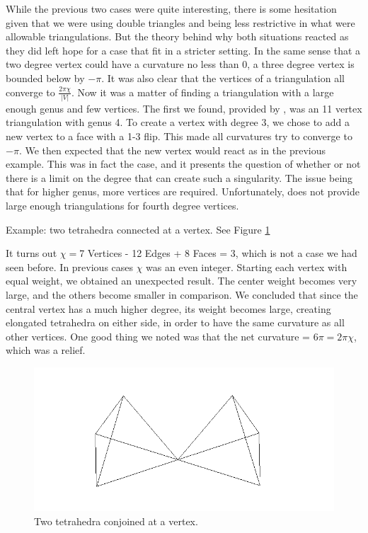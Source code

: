 \documentclass[12pt]{article}
\begin{document}
\noindent While the previous two cases were quite interesting, there is some hesitation given that we were using double triangles and being less restrictive in what were allowable triangulations. But the theory behind why both situations reacted as they did left hope for a case that fit in a stricter setting. In the same sense that a two degree vertex could have a curvature no less than 0, a three degree vertex is bounded below by $-\pi$. It was also clear that the vertices of a triangulation all converge to $\displaystyle\frac{2\pi\chi}{|V|}$. Now it was a matter of finding a triangulation with a large enough genus and few vertices. The first we found, provided by \cite{lutzmanifold}, was an 11 vertex triangulation with genus 4. To create a vertex with degree 3, we chose to add a new vertex to a face with a 1-3 flip. This made all curvatures try to converge to $-\pi$. We then expected that the new vertex would react as in the previous example. This was in fact the case, and it presents the question of whether or not there is a limit on the degree that can create such a singularity. The issue being that for higher genus, more vertices are required. Unfortunately, \cite{lutzmanifold} does not provide large enough triangulations for fourth degree vertices.\newline

\noindent Example: two tetrahedra connected at a vertex. See Figure \ref{fig:tt}\newline

\noindent It turns out $\chi = $7 Vertices - 12 Edges + 8 Faces = 3, which is not a case we had seen before. In previous cases $\chi$ was an even integer. Starting each vertex with equal weight, we obtained an unexpected result. The center weight becomes very large, and the others become smaller in comparison. We concluded that since the central vertex has a much higher degree, its weight becomes large, creating elongated tetrahedra on either side, in order to have the same curvature as all other vertices. One good thing we noted was that the net curvature = $6\pi = 2\pi\chi$, which was a relief.  

\begin{figure}
\includegraphics{tetratouch.png}
\caption{Two tetrahedra conjoined at a vertex.}
\label{fig:tt}
\end{figure}
\end{document}
